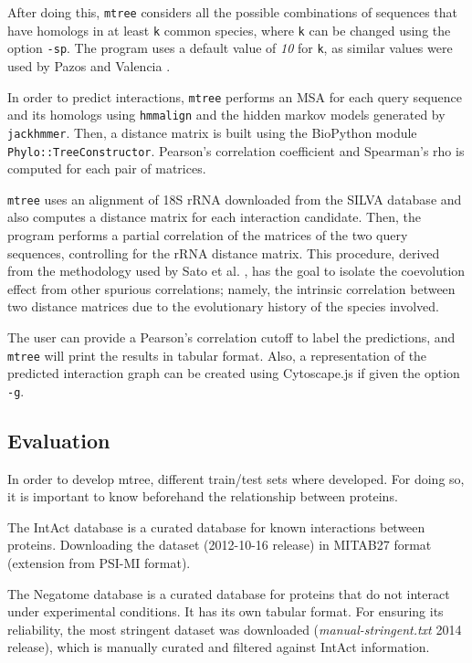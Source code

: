 \documentclass[11pt]{article}
\begin{document}
After doing this, \texttt{mtree} considers all the possible combinations of sequences that have homologs in at least \texttt{k} common species, where \texttt{k} can be changed using the option \texttt{-sp}. The program uses a default value of \emph{10} for \texttt{k}, as similar values were used by Pazos and Valencia \cite{Pazos2001}.


In order to predict interactions, \texttt{mtree} performs an MSA for each query sequence and its homologs using \texttt{hmmalign} and the hidden markov models generated by \texttt{jackhmmer}. Then, a distance matrix is built using the BioPython module \texttt{Phylo::TreeConstructor}. Pearson's correlation coefficient and Spearman's rho is computed for each pair of matrices. 

\texttt{mtree} uses an alignment of 18S rRNA downloaded from the SILVA database \cite{SILVA} and also computes a distance matrix for each interaction candidate. Then, the program performs a partial correlation of the matrices of the two query sequences, controlling for the rRNA distance matrix. This procedure, derived from the methodology used by Sato et al. \cite{Sato2005}, has the goal to isolate the coevolution effect from other spurious correlations; namely, the intrinsic correlation between two distance matrices due to the evolutionary history of the species involved.

The user can provide a Pearson's correlation cutoff to label the predictions, and \texttt{mtree} will print the results in tabular format. Also, a representation of the predicted interaction graph can be created using Cytoscape.js \cite{Franz15012016}  if given the option \texttt{-g}.



\subsection{Evaluation}
In order to develop mtree, different train/test sets where developed. For doing so, it is important to know beforehand the relationship between proteins.

The IntAct database\cite{intact} is a curated database for known interactions between proteins. Downloading the dataset (2012-10-16 release) in MITAB27 format (extension from PSI-MI format).

The Negatome database\cite{negatome} is a curated database for proteins that do not interact under experimental conditions. It has its own tabular format. For ensuring its reliability, the most stringent dataset was downloaded (\textit{manual-stringent.txt} 2014 release), which is manually curated and filtered against IntAct information.
\end{document}
